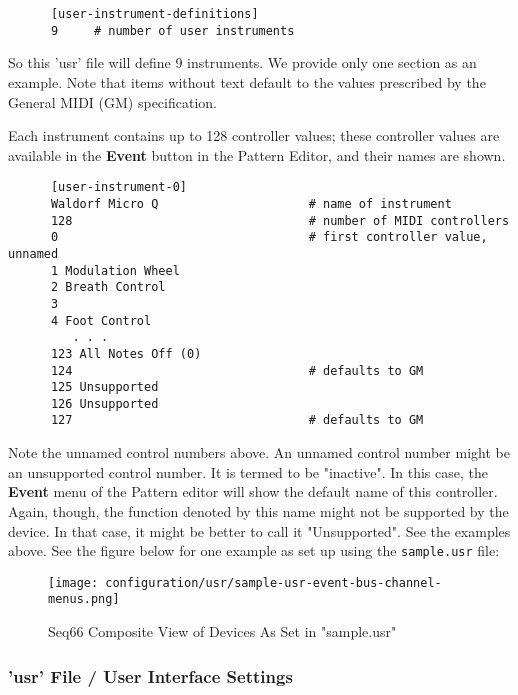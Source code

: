    \begin{verbatim}
      [user-instrument-definitions]
      9     # number of user instruments
   \end{verbatim}

   So this 'usr' file will define 9 instruments.  We provide only one section
   as an example.  Note that items without text default to the values
   prescribed by the General MIDI (GM) specification.

   Each instrument contains up
   to 128 controller values; these controller values are available in the
   \textbf{Event} button in the Pattern Editor, and their names are shown.

   \begin{verbatim}
      [user-instrument-0]
      Waldorf Micro Q                     # name of instrument
      128                                 # number of MIDI controllers
      0                                   # first controller value, unnamed
      1 Modulation Wheel
      2 Breath Control
      3 
      4 Foot Control
         . . .
      123 All Notes Off (0)
      124                                 # defaults to GM
      125 Unsupported
      126 Unsupported
      127                                 # defaults to GM
   \end{verbatim}

   Note the unnamed control numbers above.
   An unnamed control number might be an unsupported control number.
   It is termed to be "inactive".  In this case, the \textbf{Event} menu of
   the Pattern editor will show the default name of this controller.
   Again, though, the function denoted by this name might not be supported by
   the device.  In that case, it might be better to call it "Unsupported".
   See the examples above.  See the figure below for one example as set up using
   the \texttt{sample.usr} file:

\begin{figure}[H]
   \centering 
   \texttt{[image: configuration/usr/sample-usr-event-bus-channel-menus.png]}
   \caption{Seq66 Composite View of Devices As Set in "sample.usr"}
   \label{fig:sample_usr_event_bus_channel_menus}
\end{figure}

\subsubsection{'usr' File / User Interface Settings}
\label{subsubsec:usr_file_user_interface_settings}

